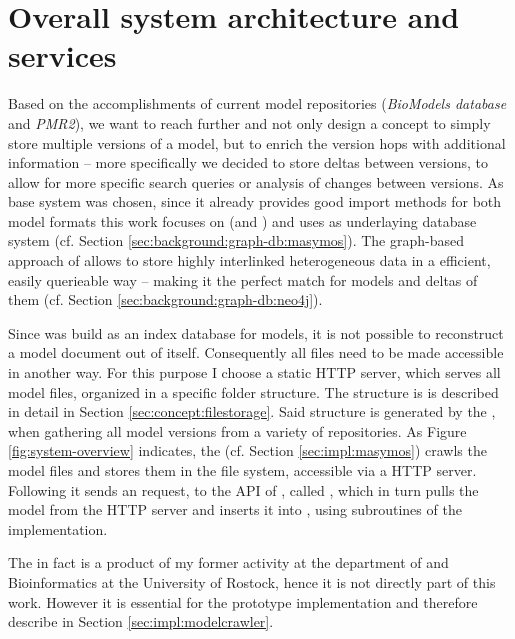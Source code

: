 \section{Overall system architecture and services}
\label{sec:concept:sysarchitecture}

Based on the accomplishments of current model repositories (\emph{BioModels database} and \emph{PMR2}), we want to reach further and not only design a concept to simply store multiple versions of a model, but to enrich the version hops with additional information -- more specifically we decided to store deltas between versions, to allow for more specific search queries or analysis of changes between versions.
As base system \masymos was chosen, since it already provides good import methods for both model formats this work focuses on (\sbml and \cellml) and uses \neoj as underlaying database system (cf. Section \ref{sec:background:graph-db:masymos}). The graph-based approach of \neoj allows to store highly interlinked heterogeneous data in a efficient, easily querieable way -- making it the perfect match for \sysbio models and deltas of them (cf. Section \ref{sec:background:graph-db:neo4j}).  

Since \masymos was build as an index database for models, it is not possible to reconstruct a \xml model document out of \masymos itself. Consequently all files need to be made accessible in another way. For this purpose I choose a static HTTP server, which serves all model files, organized in a specific folder structure. The structure is is described in detail in Section \ref{sec:concept:filestorage}.
Said structure is generated by the \modelcrawler, when gathering all model versions from a variety of repositories. As Figure \ref{fig:system-overview} indicates, the \modelcrawler (cf. Section \ref{sec:impl:masymos}) crawls the model files and stores them in the file system, accessible via a HTTP server. Following it sends an request, to the \rest API of \masymos, called \morre, which in turn pulls the model from the HTTP server and inserts it into \neoj, using subroutines of the \masymos implementation.

The \modelcrawler in fact is a product of my former activity at the department of \sysbio and Bioinformatics at the University of Rostock, hence it is not directly part of this work. However it is essential for the prototype implementation and therefore describe in Section \ref{sec:impl:modelcrawler}.

